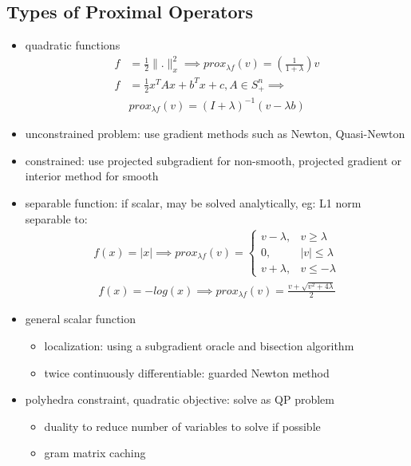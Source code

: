 \documentclass[8pt,letter]{article}
\begin{document}
\begin{multicols*}{2}
    \subsection{Types of Proximal Operators}
    \begin{itemize}
    \item quadratic functions
      \begin{align*}
        f&=\frac{1}{2} \|.\|_x^2 \implies prox_{\lambda f}(v) = (\frac{1}{1+\lambda})v\\
        f&=\frac{1}{2}x^T A x + b^T x + c, A \in S_+^n \implies\\
        &prox_{\lambda f}(v)=(I+\lambda)^{-1}(v-\lambda b)
      \end{align*}
    \item unconstrained problem: use gradient methods such as Newton, Quasi-Newton
    \item constrained: use projected subgradient for non-smooth, projected gradient or interior method for smooth
    \item separable function: if scalar, may be solved analytically, eg:
      L1 norm separable to:
      \begin{align*}
        f(x) = |x| \implies prox_{\lambda f}(v) =
        \begin{cases}
          v-\lambda ,& v \geq \lambda\\
          0,& |v| \leq \lambda\\
          v+\lambda, & v \leq -\lambda
        \end{cases}
      \end{align*}
      \begin{align*}
        f(x) = -log(x) \implies prox_{\lambda f}(v) = \frac{v+\sqrt{v^2+4\lambda}}{2}
      \end{align*}
    \item general scalar function
      \begin{itemize}
      \item localization: using a subgradient oracle and bisection algorithm
      \item twice continuously differentiable: guarded Newton method
      \end{itemize}
    \item polyhedra constraint, quadratic objective: solve as QP problem
      \begin{itemize}
      \item duality to reduce number of variables to solve if possible
      \item gram matrix caching

\end{itemize}
\end{itemize}
\end{multicols*}
\end{document}
